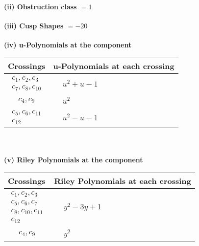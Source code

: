 \documentclass[1p]{elsarticle_modified}
\theoremstyle{definition}
\begin{document}
\flushleft \textbf{(ii) Obstruction class $= 1$}\\~\\
\flushleft \textbf{(iii) Cusp Shapes $= -20$}\\~\\
\newpage\renewcommand{\arraystretch}{1}
\flushleft \textbf{(iv) u-Polynomials at the component}\newline \\
\begin{tabular}{m{50pt}|m{274pt}}
Crossings & \hspace{64pt}u-Polynomials at each crossing \\
\hline $$\begin{aligned}c_{1},c_{2},c_{3}\\c_{7},c_{8},c_{10}\end{aligned}$$&$\begin{aligned}
&u^2+u-1
\end{aligned}$\\
\hline $$\begin{aligned}c_{4},c_{9}\end{aligned}$$&$\begin{aligned}
&u^2
\end{aligned}$\\
\hline $$\begin{aligned}c_{5},c_{6},c_{11}\\c_{12}\end{aligned}$$&$\begin{aligned}
&u^2- u-1
\end{aligned}$\\
\hline
\end{tabular}\\~\\
\newpage\renewcommand{\arraystretch}{1}
\flushleft \textbf{(v) Riley Polynomials at the component}\newline \\
\begin{tabular}{m{50pt}|m{274pt}}
Crossings & \hspace{64pt}Riley Polynomials at each crossing \\
\hline $$\begin{aligned}c_{1},c_{2},c_{3}\\c_{5},c_{6},c_{7}\\c_{8},c_{10},c_{11}\\c_{12}\end{aligned}$$&$\begin{aligned}
&y^2-3 y+1
\end{aligned}$\\
\hline $$\begin{aligned}c_{4},c_{9}\end{aligned}$$&$\begin{aligned}
&y^2
\end{aligned}$\\
\hline
\end{tabular}\\~\\
\end{document}
